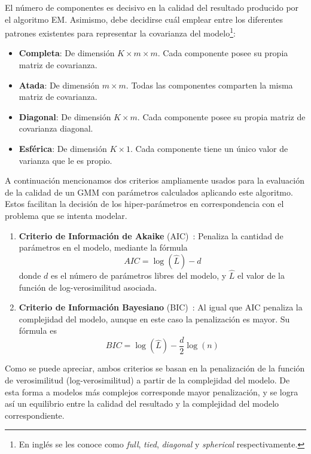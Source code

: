 El número de componentes es decisivo en la calidad del resultado producido por el algoritmo EM\@.
Asimismo, debe decidirse cuál emplear entre los diferentes patrones existentes para representar la covarianza del modelo\footnote{En inglés se les conoce como \textit{full}, \textit{tied}, \textit{diagonal} y \textit{spherical} respectivamente.}:
\begin{itemize}
    \item \textbf{Completa}: De dimensión $K\times m\times m$.
    Cada componente posee su propia matriz de covarianza.
    \item \textbf{Atada}: De dimensión $m\times m$.
    Todas las componentes comparten la misma matriz de covarianza.
    \item \textbf{Diagonal}: De dimensión $K\times m$.
    Cada componente posee su propia matriz de covarianza diagonal.
    \item \textbf{Esférica}: De dimensión $K\times 1$.
    Cada componente tiene un único valor de varianza que le es propio.
\end{itemize}
A continuación mencionamos dos criterios ampliamente usados para la evaluación de la calidad de un GMM con parámetros calculados aplicando este algoritmo.
Estos facilitan la decisión de los hiper-parámetros en correspondencia con el problema que se intenta modelar.

\begin{enumerate}
    \item \textbf{Criterio de Información de Akaike} (AIC)~\cite{Akaike74}:
    Penaliza la cantidad de parámetros en el modelo, mediante la fórmula
    \begin{equation*}
        AIC = \log(\hat{L}) - d
    \end{equation*}
    donde $d$ es el número de parámetros libres del modelo, y $\hat L$ el valor de la función de log-verosimilitud asociada.
    \item \textbf{Criterio de Información Bayesiano} (BIC)~\cite{Schwarz78}: Al igual que AIC penaliza la complejidad del modelo, aunque en este caso la penalización es mayor.
    Su fórmula es
    \begin{equation*}
        BIC = \log(\hat{L}) - \frac{d}{2}\log(n)
    \end{equation*}
\end{enumerate}

Como se puede apreciar, ambos criterios se basan en la penalización de la función de verosimilitud (log-verosimilitud) a partir de la complejidad del modelo.
De esta forma a modelos más complejos corresponde mayor penalización, y se logra así un equilibrio entre la calidad del resultado y la complejidad del modelo correspondiente.

